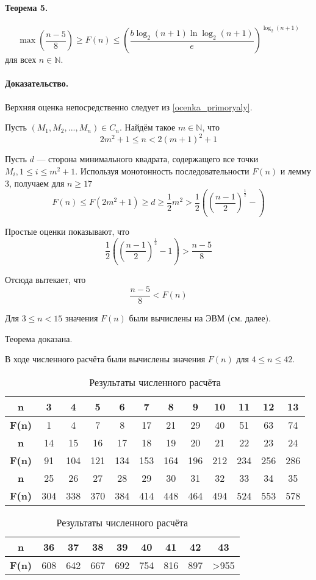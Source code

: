 \documentclass[a4paper,14pt]{article} %
\begin{document}
\paragraph{Теорема 5.}

$$
 \max\left( \frac{n-5}{8} \right) \geq F(n) \leq \left( \frac{b \log_2(n+1) \ln \log_2 (n+1)}{e}\right)^{\log_2(n+1)}
$$
для всех $n\in\mathbb{N}$.

\paragraph{Доказательство.}
Верхняя оценка непосредственно следует из \ref{ocenka_primoryaly}.

Пусть $\left(M_1, M_2, ..., M_n\right) \in C_n$.
Найдём такое $m\in \mathbb{N}$, что
$$
2m^2+1 \leq n < 2(m+1)^2 +1
$$

Пусть $d$ --- сторона минимального квадрата, содержащего все точки $M_i, 1\leq i \leq m^2+1$.
Используя монотонность последовательности $F(n)$ и лемму 3, получаем для $n\geq 17$
$$
F(n) \leq F\left(2m^2+1\right)\geq d \geq \frac{1}{2}m^2 > \frac{1}{2}\left(\left(\frac{n-1}{2}\right)^\frac{1}{2} - \right)
$$

Простые оценки показывают, что
$$
\frac{1}{2}\left(\left(\frac{n-1}{2}\right)^\frac{1}{2} -1 \right) > \frac{n-5}{8}
$$

Отсюда вытекает, что
$$
\frac{n-5}{8}<F(n)
$$

Для $3 \leq n < 15$ значения $F(n)$ были вычислены на ЭВМ (см. далее).

Теорема доказана.

В ходе численного расчёта были вычислены значения $F(n)$ для $4\leq n \leq 42$.

\begin{table}[H]
\caption{Результаты численного расчёта}
\label{tabular:pc_counted}
\begin{center}
\begin{tabular}{|c|c|c|c|c|c|c|c|c|c|c|c|}
\hline
\textbf{n}    &  3 & 4 & 5 & 6 &  7 &  8 &  9 & 10 & 11 & 12 & 13 \\
\hline
\textbf{F(n)} &  1 & 4 & 7 & 8 & 17 & 21 & 29 & 40 & 51 & 63 & 74  \\
\hline
\hline
\textbf{n}    &  14 &  15 &  16 &  17 &  18 &  19 &  20 &  21 &  22 &  23 &  24 \\
\hline
\textbf{F(n)} &  91 & 104 & 121 & 134 & 153 & 164 & 196 & 212 & 234 & 256 & 286  \\
\hline
\hline
\textbf{n}    &  25 &  26 &  27 &  28 &  29 &  30 &  31 &  32 &  33 &  34 &  35 \\
\hline
\textbf{F(n)} & 304 & 338 & 370 & 384 & 414 & 448 & 464 & 494 & 524 & 553 & 578  \\
\hline
\end{tabular}
\begin{tabular}{|c|c|c|c|c|c|c|c|c|}
\hline
\textbf{n}    &  36 &  37 &  38 &  39 &  40 &  41 &  42 &  43  \\
\hline
\textbf{F(n)} & 608 & 642 & 667 & 692 & 754 & 816 & 897 & >955  \\
\hline
\end{tabular}
\end{center}
\end{table}
\end{document}

